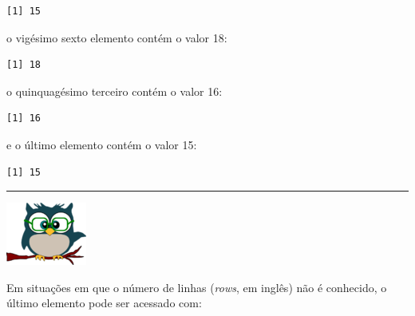 \documentclass[
]{article}
\newenvironment{Shaded}{\begin{snugshade}}{\end{snugshade}}
\newcommand{\DecValTok}[1]{\textcolor[rgb]{0.00,0.00,0.81}{#1}}
\newcommand{\NormalTok}[1]{#1}
\newcommand{\SpecialCharTok}[1]{\textcolor[rgb]{0.00,0.00,0.00}{#1}}
\begin{document}
\begin{verbatim}
[1] 15
\end{verbatim}

o vigésimo sexto elemento contém o valor 18:

\begin{Shaded}
\end{Shaded}

\begin{verbatim}
[1] 18
\end{verbatim}

o quinquagésimo terceiro contém o valor 16:

\begin{Shaded}
\end{Shaded}

\begin{verbatim}
[1] 16
\end{verbatim}

e o último elemento contém o valor 15:

\begin{Shaded}
\end{Shaded}

\begin{verbatim}
[1] 15
\end{verbatim}

\begin{center}\rule{0.5\linewidth}{0.5pt}\end{center}

\begin{flushleft}\includegraphics[width=0.08\linewidth]{coruja} \end{flushleft}

Em situações em que o número de linhas (\emph{rows}, em inglês) não é
conhecido, o último elemento pode ser acessado com:
\end{document}
